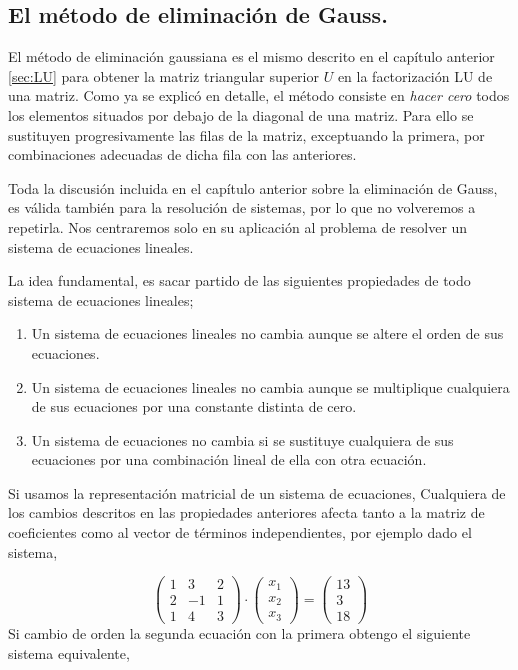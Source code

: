 \subsection{El método de eliminación de Gauss.} El método de eliminación gaussiana es el mismo descrito en el capítulo anterior \ref{sec:LU} para obtener la matriz triangular superior $U$ en la factorización LU de una matriz. Como ya se explicó en detalle, el método consiste en \emph{hacer  cero} todos los elementos situados por debajo de la diagonal de una matriz. Para ello se sustituyen progresivamente las filas de la matriz, exceptuando la primera, por combinaciones adecuadas de dicha fila con las anteriores.

Toda la discusión incluida en el capítulo anterior sobre la eliminación de Gauss, es válida también para la resolución de sistemas, por lo que no volveremos a repetirla. Nos centraremos solo en su aplicación al problema de resolver un sistema de ecuaciones lineales.

La idea fundamental, es sacar partido de las siguientes propiedades de todo sistema de ecuaciones lineales;
\begin{enumerate}
\item Un sistema de ecuaciones lineales no cambia aunque se altere el orden de sus ecuaciones.
\item Un sistema de ecuaciones lineales no cambia aunque se multiplique cualquiera de sus ecuaciones por una constante distinta de cero.
\item Un sistema de ecuaciones no cambia si se sustituye cualquiera de sus ecuaciones por una combinación lineal de ella con otra ecuación.
\end{enumerate}
 
Si usamos la representación matricial de un sistema de ecuaciones, Cualquiera de los cambios descritos en las propiedades anteriores afecta tanto a la matriz de coeficientes como al vector de términos independientes, por ejemplo dado el sistema,
 
\begin{equation*}
\begin{pmatrix}
1& 3& 2\\
2& -1& 1\\
1& 4& 3
\end{pmatrix}\cdot \begin{pmatrix}
x_1\\
x_2\\
x_3
\end{pmatrix}=\begin{pmatrix}
13\\
3\\
18
\end{pmatrix}
\end{equation*}
Si cambio de orden la segunda ecuación con la primera obtengo el siguiente sistema equivalente,

